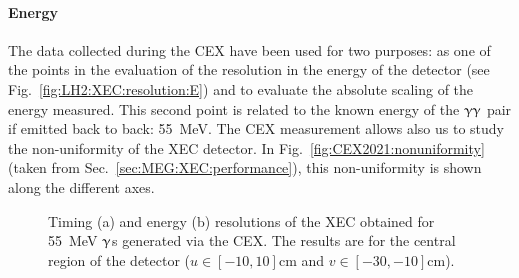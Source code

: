 \begin{refsection}
        \paragraph{Energy} The data collected during the CEX have been used for two purposes: as one of the points in the evaluation of the resolution in the energy of the detector (see Fig.~\ref{fig:LH2:XEC:resolution:E}) and to evaluate the absolute scaling of the energy measured.
        This second point is related to the known energy of the $\upgamma\upgamma$ pair if emitted back to back: \SI{55}{MeV}.
        The CEX measurement allows also us to study the non-uniformity of the XEC detector.
        In Fig.~\ref{fig:CEX2021:nonuniformity} (taken from Sec.~\ref{sec:MEG:XEC:performance}), this non-uniformity is shown along the different axes.
        
        \begin{figure}[]   
            \centering
            \hfill
            \caption{Timing (a) and energy (b) resolutions of the XEC obtained for \SI{55}{MeV} $\upgamma$s generated via the CEX. The results are for the central region of the detector ($u\in[-10,10]$cm and $v\in[-30,-10]$cm).}
            \label{fig:LH2:XEC:resolution}
        \end{figure}


\end{refsection}
